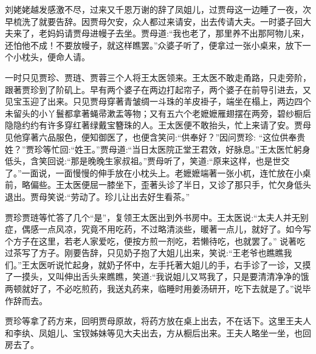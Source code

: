 \begin{parag}
    刘姥姥越发感激不尽，过来又千恩万谢的辞了凤姐儿，过贾母这一边睡了一夜，次早梳洗了就要告辞。因贾母欠安，众人都过来请安，出去传请大夫。一时婆子回大夫来了，老妈妈请贾母进幔子去坐。贾母道:“我也老了，那里养不出那阿物儿来，还怕他不成！不要放幔子，就这样瞧罢。”众婆子听了，便拿过一张小桌来，放下一个小枕头，便命人请。
\end{parag}


\begin{parag}
    一时只见贾珍、贾琏、贾蓉三个人将王太医领来。王太医不敢走甬路，只走旁阶，跟著贾珍到了阶矶上。早有两个婆子在两边打起帘子，两个婆子在前导引进去，又见宝玉迎了出来。只见贾母穿著青皱绸一斗珠的羊皮褂子，端坐在榻上，两边四个未留头的小丫鬟都拿著蝇帚漱盂等物；又有五六个老嬷嬷雁翅摆在两旁，碧纱橱后隐隐约约有许多穿红著绿戴宝簪珠的人。王太医便不敢抬头，忙上来请了安。贾母见他穿著六品服色，便知御医了，也便含笑问:“供奉好？”因问贾珍: “这位供奉贵姓？”贾珍等忙回:“姓王。”贾母道:“当日太医院正堂王君效，好脉息。”王太医忙躬身低头，含笑回说:“那是晚晚生家叔祖。”贾母听了，笑道:“原来这样，也是世交了。”一面说，一面慢慢的伸手放在小枕头上。老嬷嬷端著一张小杌，连忙放在小桌前，略偏些。王太医便屈一膝坐下，歪著头诊了半日，又诊了那只手，忙欠身低头退出。贾母笑说:“劳动了。珍儿让出去好生看茶。”
\end{parag}


\begin{parag}
    贾珍贾琏等忙答了几个“是”，复领王太医出到外书房中。王太医说:“太夫人并无别症，偶感一点风凉，究竟不用吃药，不过略清淡些，暖著一点儿，就好了。如今写个方子在这里，若老人家爱吃，便按方煎一剂吃，若懒待吃，也就罢了。” 说著吃过茶写了方子。刚要告辞，只见奶子抱了大姐儿出来，笑说:“王老爷也瞧瞧我们。”王太医听说忙起身，就奶子怀中，左手托著大姐儿的手，右手诊了一诊，又摸了一摸头，又叫伸出舌头来瞧瞧，笑道:“我说姐儿又骂我了，只是要清清净净的饿两顿就好了，不必吃煎药，我送丸药来，临睡时用姜汤研开，吃下去就是了。”说毕作辞而去。
\end{parag}


\begin{parag}
    贾珍等拿了药方来，回明贾母原故，将药方放在桌上出去，不在话下。这里王夫人和李纨、凤姐儿、宝钗姊妹等见大夫出去，方从橱后出来。王夫人略坐一坐，也回房去了。
\end{parag}


